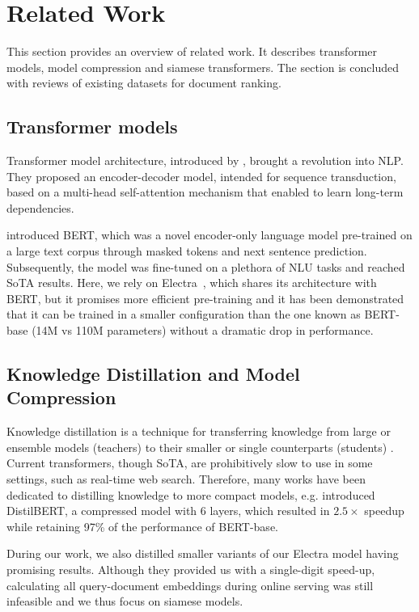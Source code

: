 \documentclass[letterpaper]{article} \usepackage{aaai22 }  \usepackage{times}  \usepackage{helvet}  \usepackage{courier}  \usepackage[hyphens]{url}  \usepackage{graphicx} \usepackage{amsmath,amsfonts,amssymb, mathabx,bm,bbm}
\begin{document}
\section{Related Work}\label{sec:related_work}
This section provides an overview of related work. It describes transformer models, model compression and siamese transformers. The section is concluded with reviews of existing datasets for document ranking.

\subsection{Transformer models}\label{subsec:transformers}
Transformer model architecture, introduced by \citet{vaswani2017attention}, brought a revolution into NLP. They proposed an encoder-decoder model, intended for sequence transduction, based on a multi-head self-attention mechanism that enabled to learn long-term dependencies.

\citet{bert} introduced BERT, which was a novel encoder-only language model pre-trained on a large text corpus through masked tokens and next sentence prediction. Subsequently, the model was fine-tuned on a plethora of NLU tasks and reached SoTA results. Here, we rely on Electra~\cite{electra}, which shares its architecture with BERT, but it promises more efficient pre-training and it has been demonstrated that it can be trained in a smaller configuration than the one known as BERT-base (14M vs 110M parameters) without a dramatic drop in performance.


\subsection{Knowledge Distillation and Model Compression}\label{subsec:KD}
Knowledge distillation is a technique for transferring knowledge from large or ensemble models (teachers) to their smaller or single counterparts (students) \cite{bucila-model_compression}.
Current transformers, though SoTA, are prohibitively slow to  use in some settings, such as real-time web search. Therefore, many works have been dedicated to distilling knowledge to more compact models, e.g. \citet{distilbert} introduced DistilBERT, a compressed model with 6 layers, which resulted in $2.5\times$ speedup while retaining 97\% of the performance of BERT-base. 

During our work, we also distilled smaller variants of our Electra model having promising results. 
Although they provided us with a single-digit speed-up, calculating all query-document embeddings during online serving was still infeasible and we thus focus on siamese models.
\end{document}
